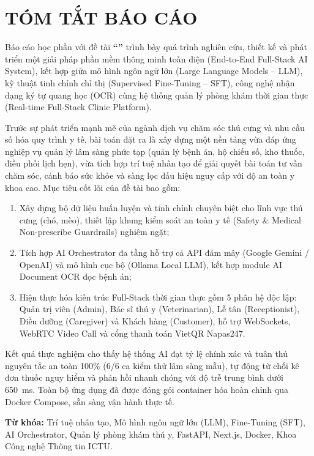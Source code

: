 
\chapter*{TÓM TẮT BÁO CÁO}

Báo cáo học phần \textbf{\course} với đề tài \textbf{``\reporttitle''} trình bày quá trình nghiên cứu, thiết kế và phát triển một giải pháp phần mềm thông minh toàn diện (End-to-End Full-Stack AI System), kết hợp giữa mô hình ngôn ngữ lớn (Large Language Models -- LLM), kỹ thuật tinh chỉnh chỉ thị (Supervised Fine-Tuning -- SFT), công nghệ nhận dạng ký tự quang học (OCR) cùng hệ thống quản lý phòng khám thời gian thực (Real-time Full-Stack Clinic Platform).

Trước sự phát triển mạnh mẽ của ngành dịch vụ chăm sóc thú cưng và nhu cầu số hóa quy trình y tế, bài toán đặt ra là xây dựng một nền tảng vừa đáp ứng nghiệp vụ quản lý lâm sàng phức tạp (quản lý bệnh án, hộ chiếu số, kho thuốc, điều phối lịch hẹn), vừa tích hợp trí tuệ nhân tạo để giải quyết bài toán tư vấn chăm sóc, cảnh báo sức khỏe và sàng lọc dấu hiệu nguy cấp với độ an toàn y khoa cao. Mục tiêu cốt lõi của đề tài bao gồm:
\begin{enumerate}[label=\arabic*)]
    \item Xây dựng bộ dữ liệu huấn luyện và tinh chỉnh chuyên biệt cho lĩnh vực thú cưng (chó, mèo), thiết lập khung kiểm soát an toàn y tế (Safety \& Medical Non-prescribe Guardrails) nghiêm ngặt;
    \item Tích hợp AI Orchestrator đa tầng hỗ trợ cả API đám mây (Google Gemini / OpenAI) và mô hình cục bộ (Ollama Local LLM), kết hợp module AI Document OCR đọc bệnh án;
    \item Hiện thực hóa kiến trúc Full-Stack thời gian thực gồm 5 phân hệ độc lập: Quản trị viên (Admin), Bác sĩ thú y (Veterinarian), Lễ tân (Receptionist), Điều dưỡng (Caregiver) và Khách hàng (Customer), hỗ trợ WebSockets, WebRTC Video Call và cổng thanh toán VietQR Napas247.
\end{enumerate}

Kết quả thực nghiệm cho thấy hệ thống AI đạt tỷ lệ chính xác và tuân thủ nguyên tắc an toàn 100\% (6/6 ca kiểm thử lâm sàng mẫu), tự động từ chối kê đơn thuốc nguy hiểm và phản hồi nhanh chóng với độ trễ trung bình dưới 650~ms. Toàn bộ ứng dụng đã được đóng gói container hóa hoàn chỉnh qua Docker Compose, sẵn sàng vận hành thực tế.

\vspace{1.0cm}
\noindent\textbf{Từ khóa:} Trí tuệ nhân tạo, Mô hình ngôn ngữ lớn (LLM), Fine-Tuning (SFT), AI Orchestrator, Quản lý phòng khám thú y, FastAPI, Next.js, Docker, Khoa Công nghệ Thông tin ICTU.

\clearpage
